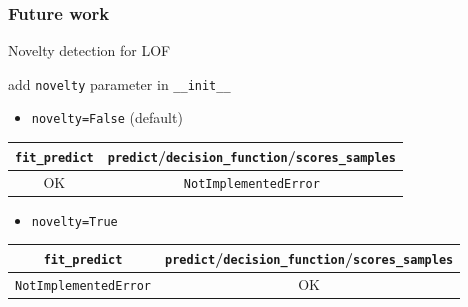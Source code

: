 \documentclass[slidetop,11pt]{beamer}
\begin{document}
\renewcommand{\arraystretch}{1.5}

\begin{frame}\frametitle{Future work}

Novelty detection for LOF
\begin{center}
add \texttt{novelty} parameter in \texttt{__init__}
\end{center}


\begin{itemize}
  \item \texttt{novelty=False} (default)
\end{itemize}
{\footnotesize
  \begin{center}
  \begin{tabular}{ | c | c | }
    \hline
    \texttt{fit_predict} & \texttt{predict}/\texttt{decision_function}/\texttt{scores_samples}\\ \hline
    OK & \texttt{NotImplementedError} \\ \hline 
  \end{tabular}
\end{center}
}


\begin{itemize}
  \item \texttt{novelty=True}
\end{itemize}
{\footnotesize
  \begin{center}
  \begin{tabular}{ | c | c | }
    \hline
    \texttt{fit_predict} & \texttt{predict}/\texttt{decision_function}/\texttt{scores_samples}\\ \hline
    \texttt{NotImplementedError} & OK \\ \hline 
  \end{tabular}
\end{center}
}

\end{frame}





\end{document}
